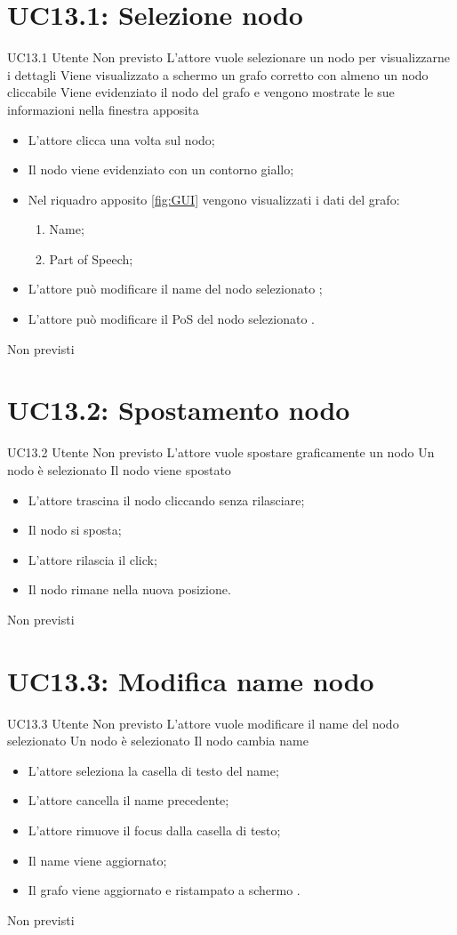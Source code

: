 \documentclass[../AnalisideiRequisiti.tex]{subfiles}
\begin{document}
\section{UC13.1: Selezione nodo}
\UserCase
{UC13.1}
{Utente}
{Non previsto}
{L'attore vuole selezionare un nodo per visualizzarne i dettagli}
{Viene visualizzato a schermo un grafo corretto con almeno un nodo cliccabile }
{Viene evidenziato il nodo del grafo e vengono mostrate le sue informazioni nella finestra apposita}
{
	\begin{itemize}
		\item{} L'attore clicca una volta sul nodo;
		\item{} Il nodo viene evidenziato con un contorno giallo;
		\item{} Nel riquadro apposito \ref{fig:GUI} vengono visualizzati i dati del grafo:
		\begin{enumerate}
			\item{} Name;
			\item{} Part of Speech;
		\end{enumerate}
		\item{} L'attore può modificare il name del nodo selezionato ;
		\item{} L'attore può modificare il PoS del nodo selezionato .
	\end{itemize}
}
{Non previsti}

\section{UC13.2: Spostamento nodo}
\UserCase
{UC13.2}
{Utente}
{Non previsto}
{L'attore vuole spostare graficamente un nodo}
{Un nodo è selezionato }
{Il nodo viene spostato}
{
	\begin{itemize}
		\item{} L'attore trascina il nodo cliccando senza rilasciare;
		\item{} Il nodo si sposta;
		\item{} L'attore rilascia il click;
		\item{} Il nodo rimane nella nuova posizione.
	\end{itemize}
}
{Non previsti}

\section{UC13.3: Modifica name nodo}
\UserCase
{UC13.3}
{Utente}
{Non previsto}
{L'attore vuole modificare il name del nodo selezionato}
{Un nodo è selezionato }
{Il nodo cambia name}
{
	\begin{itemize}
		\item{} L'attore seleziona la casella di testo del name;
		\item{} L'attore cancella il name precedente;
		\item{} L'attore rimuove il focus dalla casella di testo;
		\item{} Il name viene aggiornato;
		\item{} Il grafo viene aggiornato e ristampato a schermo .
	\end{itemize}
}
{Non previsti}
\end{document}
